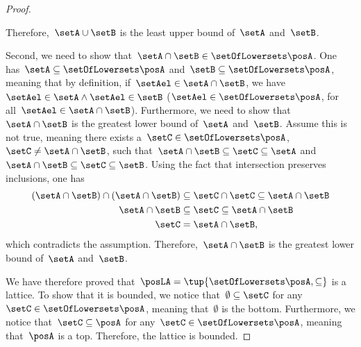 \begin{proof}
\begin{compactitem}
Therefore,~$\setA\cup \setB$ is the least upper bound of~$\setA$ and~$\setB$.
        \item Second, we need to show that~$\setA\cap \setB\in \setOfLowersets \posA$.
        One has~$\setA\subseteq \setOfLowersets \posA$ and~$\setB\subseteq \setOfLowersets \posA$, meaning that by definition, if~$\setAel\in \setA\cap \setB$, we have~$\setAel \in \setA\wedge \setAel\in \setB$ ($\setAel\in \setOfLowersets \posA$, for all~$\setAel\in \setA\cap \setB$).
        Furthermore, we need to show that~$\setA\cap \setB$ is the greatest lower bound of~$\setA$ and~$\setB$.
        Assume this is not true, meaning there exists a~$\setC\in \setOfLowersets \posA$,~$\setC\neq \setA\cap \setB$, such that~$\setA\cap \setB\subseteq \setC\subseteq \setA$ and~$\setA\cap \setB\subseteq \setC\subseteq \setB$.
        Using the fact that intersection preserves inclusions, one has
        \begin{equation}
            \begin{aligned}
            (\setA\cap \setB)
                \cap (\setA\cap \setB) &\subseteq \setC \cap \setC \subseteq \setA\cap \setB\\
                \setA\cap \setB &\subseteq \setC\subseteq \setA\cap \setB\\
                \setC&=\setA\cap \setB,
            \end{aligned}
        \end{equation}
        which contradicts the assumption.
        Therefore,~$\setA\cap \setB$ is the greatest lower bound of~$\setA$ and~$\setB$.
    \end{compactitem}
    We have therefore proved that~$\posLA=\tup{\setOfLowersets \posA,\subseteq}$ is a lattice.
    To show that it is bounded, we notice that~$\emptyset \subseteq \setC$ for any~$\setC\in \setOfLowersets \posA$, meaning that~$\emptyset$ is the bottom.
    Furthermore, we notice that~$\setC\subseteq \posA$ for any~$\setC\in \setOfLowersets \posA$, meaning that~$\posA$ is a top.
    Therefore, the lattice is bounded.
\end{proof}

